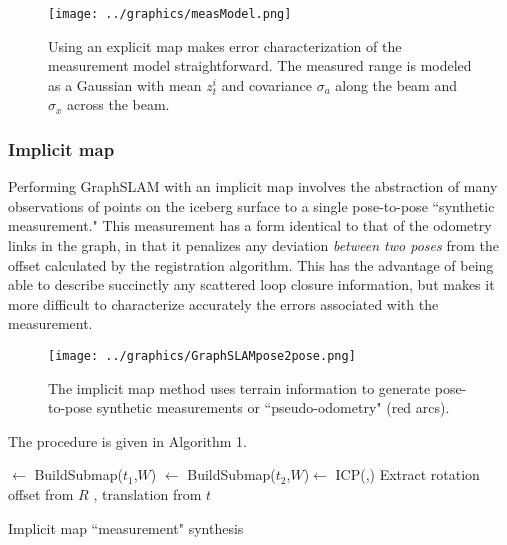 \begin{figure}[htb]
   \centering
   \texttt{[image: ../graphics/measModel.png]} %
   \caption{Using an explicit map makes error characterization of the measurement model straightforward. The measured range is modeled as a Gaussian with mean $z_t^i$ and covariance $\sigma_{a}$ along the beam and $\sigma_{x}$ across the beam.}
   \label{fig:GraphSLAMmeasModel}
\end{figure}

\subsubsection{Implicit map}

Performing GraphSLAM with an implicit map involves the abstraction of many observations of points on the iceberg surface to a single pose-to-pose ``synthetic measurement." This measurement has a form identical to that of the odometry links in the graph, in that it penalizes any deviation \emph{between two poses} from the offset calculated by the registration algorithm.  This has the advantage of being able to describe succinctly any scattered loop closure information, but makes it more difficult to characterize accurately the errors associated with the measurement. 

\begin{figure}[htb]
   \centering
   \texttt{[image: ../graphics/GraphSLAMpose2pose.png]} %
   \caption{The implicit map method uses terrain information to generate pose-to-pose synthetic measurements or ``pseudo-odometry" (red arcs). }
   \label{fig:RelativePoses}
\end{figure}

The procedure is given in Algorithm 1.


\begin{algorithm}
\DontPrintSemicolon
\SetAlgoLined
{}
\MapOne $\leftarrow$ BuildSubmap($t_1$,$W$) \;
\MapTwo $\leftarrow$ BuildSubmap($t_2$,$W$)\;
[$R$, $t$] $\leftarrow$ ICP(\MapOne,\MapTwo)  \;
Extract rotation offset from $R$ , translation from $t$\;
 \caption{Implicit map ``measurement" synthesis}
\end{algorithm} 


